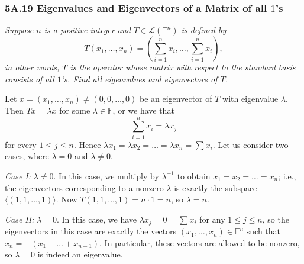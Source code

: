 \documentclass{article}
\begin{document}
\subsubsection*{5A.19 Eigenvalues and Eigenvectors of a Matrix of all $1$'s}
\textit{Suppose $n$ is a positive integer and $T\in \mathcal L(\mathbb F^n)$ is defined by}
$$T(x_1, \ldots, x_n) = \left(\sum_{i=1}^n x_i, \ldots, \sum_{i=1}^n x_i\right),$$
\textit{in other words, $T$ is the operator whose matrix with respect to the standard basis consists of all $1$'s. Find all eigenvalues and eigenvectors of $T$.}
\begin{solution}
Let $x = (x_1, \ldots, x_n)\neq (0, 0, \ldots, 0)$ be an eigenvector of $T$ with eigenvalue $\lambda$. Then $Tx = \lambda x$ for some $\lambda \in\mathbb F$, or we have that
$$\sum_{i=1}^n x_i = \lambda x_j$$
for every $1 \leq j \leq n$.
Hence $\lambda x_1 = \lambda x_2 = \ldots = \lambda x_n = \sum x_i$. Let us consider two cases, where $\lambda = 0$ and $\lambda \neq 0$.

\textit{Case I:} $\lambda \neq 0$. In this case, we multiply by $\lambda^{-1}$ to obtain $x_1 = x_2 = \ldots = x_n$; i.e., the eigenvectors corresponding to a nonzero $\lambda$ is exactly the subspace $\boxed{\langle (1, 1, \ldots, 1) \rangle}$. Now $T(1, 1, \ldots, 1) = n\cdot 1 = n$, so $\boxed{\lambda = n}$.

\textit{Case II:} $\lambda = 0$. In this case, we have $\lambda x_j = 0 = \sum x_i$ for any $1 \leq j \leq n$, so the eigenvectors in this case are exactly the vectors $(x_1, \ldots, x_n) \in \mathbb F^n$ such that $x_n = -(x_1 + \ldots + x_{n-1})$. In particular, these vectors are allowed to be nonzero, so $\boxed{\lambda = 0}$ is indeed an eigenvalue.
\end{solution}
\end{document}
